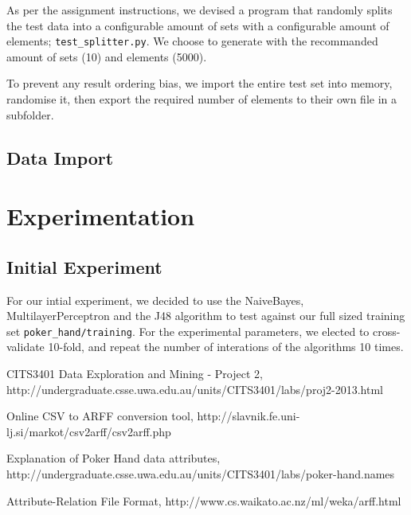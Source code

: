 \documentclass[11pt, a4paper]{article}
\begin{document}
As per the assignment instructions, we devised a program that randomly splits the test data into a configurable amount of sets with a configurable amount of elements; \texttt{test\_splitter.py}. We choose to generate with the recommanded amount of sets (10) and elements (5000).

To prevent any result ordering bias, we import the entire test set into memory, randomise it, then export the required number of elements to their own file in a subfolder.

\subsection*{Data Import}

\section*{Experimentation}

\subsection*{Initial Experiment}

For our intial experiment, we decided to use the NaiveBayes, MultilayerPerceptron and the J48 algorithm to test against our full sized training set \texttt{poker\_hand/training}. For the experimental parameters, we elected to cross-validate 10-fold, and repeat the number of interations of the algorithms 10 times.

\begin{thebibliography}{9}

	CITS3401 Data Exploration and Mining - Project 2,
	http://undergraduate.csse.uwa.edu.au/units/CITS3401/labs/proj2-2013.html

	Online CSV to ARFF conversion tool,
	http://slavnik.fe.uni-lj.si/markot/csv2arff/csv2arff.php

	Explanation of Poker Hand data attributes,
	http://undergraduate.csse.uwa.edu.au/units/CITS3401/labs/poker-hand.names

	Attribute-Relation File Format,
	http://www.cs.waikato.ac.nz/ml/weka/arff.html

\end{thebibliography}


\end{document}
